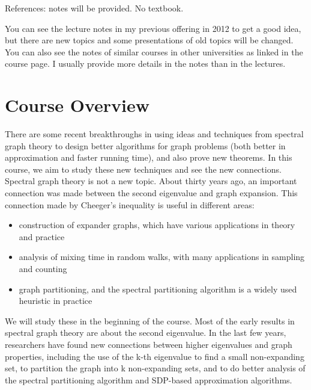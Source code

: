 \documentclass[11pt,a4paper]{report}
\theoremstyle{theoremdd}
\theoremstyle{claims1}
\theoremstyle{proofs1}
\def\labelitemi{--}
\begin{document}
\newline
\newline
References: notes will be provided. No textbook.
\begin{addmargin}[1em]{0em}
	 You can see the lecture notes in my previous offering in 2012 to get a good idea, but there are new topics and some presentations of old topics will be changed.
	 \newline
	 You can also see the notes of similar courses in other universities as linked in the course page. I usually provide more details in the notes than in the lectures.
\end{addmargin}

\section{Course Overview}
There are some recent breakthroughs in using ideas and techniques from spectral graph theory to design better algorithms for graph problems (both better in approximation and faster running time), and also prove new theorems. In this course, we aim to study these new techniques and see the new connections.
\newline
Spectral graph theory is not a new topic.
\newline
About thirty years ago, an important connection was made between the second eigenvalue and graph expansion. This connection made by Cheeger's inequality is useful in different areas:
\begin{itemize}
	\renewcommand\labelitemi{--}
	\item construction of expander graphs, which have various applications in theory and practice
	\item analysis of mixing time in random walks, with many applications in sampling and counting
	\item graph partitioning, and the spectral partitioning algorithm is a widely used heuristic in practice
\end{itemize}
\noindent We will study these in the beginning of the course.
\newline\newline Most of the early results in spectral graph theory are about the second eigenvalue.
\newline In the last few years, researchers have found new connections between higher eigenvalues and graph properties, including the use of the k-th eigenvalue to find a small non-expanding set, to partition the graph into k non-expanding sets, and to do better analysis of the spectral partitioning algorithm and SDP-based approximation algorithms.
\end{document}
